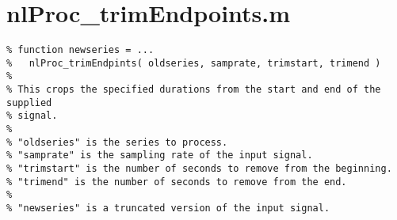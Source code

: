 \section{nlProc\_trimEndpoints.m}

\begin{verbatim}
% function newseries = ...
%   nlProc_trimEndpints( oldseries, samprate, trimstart, trimend )
%
% This crops the specified durations from the start and end of the supplied
% signal.
%
% "oldseries" is the series to process.
% "samprate" is the sampling rate of the input signal.
% "trimstart" is the number of seconds to remove from the beginning.
% "trimend" is the number of seconds to remove from the end.
%
% "newseries" is a truncated version of the input signal.
\end{verbatim}

